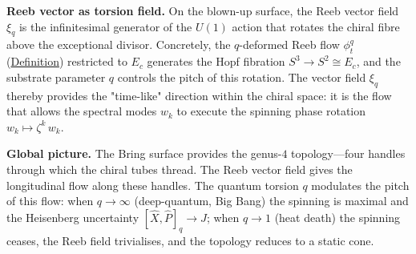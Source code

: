 \begin{remark}
\textbf{Reeb vector as torsion field.}
On the blown-up surface, the Reeb vector field $\xi_q$ is the
infinitesimal generator of the $U(1)$ action that rotates the chiral
fibre above the exceptional divisor.  Concretely, the
$q$-deformed Reeb flow $\phi_t^q$
(\hyperref[def:q-reeb-flow]{Definition}) restricted to $E_c$ generates
the Hopf fibration $S^3\to S^2\cong E_c$, and the substrate
parameter $q$ controls the pitch of this rotation.  The vector
field $\xi_q$ thereby provides the "time-like" direction within the
chiral space: it is the flow that allows the spectral modes $w_k$ to
execute the spinning phase rotation
$w_k\mapsto\zeta^k\,w_k$.

\textbf{Global picture.}
The Bring surface provides the genus-$4$ topology---four handles
through which the chiral tubes thread.  The Reeb vector field gives
the longitudinal flow along these handles.  The quantum torsion $q$
modulates the pitch of this flow: when $q\to\infty$ (deep-quantum,
Big Bang) the spinning is maximal and the Heisenberg uncertainty
$[\hat{X},\hat{P}]_q\to J$; when $q\to 1$ (heat death) the spinning
ceases, the Reeb field trivialises, and the topology reduces to a
static cone.
\end{remark}

